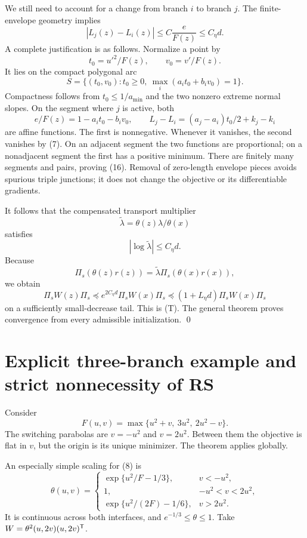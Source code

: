 \documentclass[10pt,oneside,openany]{book}
\theoremstyle{remark}\newtheorem{remark}{Remark}[chapter]
\begin{document}
We still need to account for a change from branch $i$ to branch $j$. The finite-envelope geometry implies
\begin{equation}
 |L_j(z)-L_i(z)|\le C\frac{e}{F(z)}\le C_\eta d. \tag{Q.16}
\end{equation}
A complete justification is as follows. Normalize a point by
\[
 t_0=u'^2/F(z),\qquad v_0=v'/F(z).
\]
It lies on the compact polygonal arc
\[
 S=\{(t_0,v_0):t_0\ge0,\ \max_i(a_it_0+b_iv_0)=1\}.
\]
Compactness follows from $t_0\le1/a_{\min}$ and the two nonzero extreme normal slopes. On the segment where $j$ is active, both
\[
 e/F(z)=1-a_it_0-b_iv_0,\qquad
 L_j-L_i=(a_j-a_i)t_0/2+k_j-k_i
\]
are affine functions. The first is nonnegative. Whenever it vanishes, the second vanishes by (7). On an adjacent segment the two functions are proportional; on a nonadjacent segment the first has a positive minimum. There are finitely many segments and pairs, proving (16). Removal of zero-length envelope pieces avoids spurious triple junctions; it does not change the objective or its differentiable gradients.

It follows that the compensated transport multiplier
\[
 \widetilde\lambda=\theta(z)\lambda/\theta(x)
\]
satisfies
\begin{equation}
 |\log\widetilde\lambda|\le C_\eta d. \tag{Q.17}
\end{equation}
Because
\[
 \Pi_s(\theta(z)r(z))=\widetilde\lambda\Pi_s(\theta(x)r(x)),
\]
we obtain
\[
 \Pi_sW(z)\Pi_s\preceq e^{2C_\eta d}\Pi_sW(x)\Pi_s
 \preceq(1+L_\eta d)\Pi_sW(x)\Pi_s
\]
on a sufficiently small-decrease tail. This is (T). The general theorem proves convergence from every admissible initialization. \qed


\setcounter{section}{5}
\setcounter{theorem}{2}
\setcounter{lemma}{0}
\setcounter{corollary}{0}
\setcounter{proposition}{0}
\setcounter{remark}{0}
\setcounter{equation}{13}
\section{Explicit three-branch example and strict nonnecessity of RS}
Consider
\begin{equation}
 F(u,v)=\max\{u^2+v,\ 3u^2,\ 2u^2-v\}. \tag{Q.18}
\end{equation}
The switching parabolas are $v=-u^2$ and $v=2u^2$. Between them the objective is flat in $v$, but the origin is its unique minimizer. The theorem applies globally.

An especially simple scaling for (8) is
\[
 \theta(u,v)=
 \begin{cases}
 \exp\{u^2/F-1/3\},&v<-u^2,\\
 1,&-u^2<v<2u^2,\\
 \exp\{u^2/(2F)-1/6\},&v>2u^2.
 \end{cases}
\]
It is continuous across both interfaces, and $e^{-1/3}\le\theta\le1$. Take $W=\theta^2(u,2v)(u,2v)^{\mathsf T}$.
\end{document}
